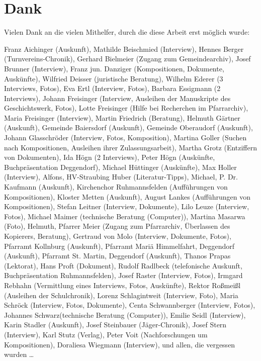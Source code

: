 \section{Dank}

Vielen Dank an die vielen Mithelfer, durch die diese Arbeit erst möglich
wurde:

Franz Aichinger (Auskunft),
Mathilde Beischmied (Interview),
Hennes Berger (Turnvereins-Chronik),
Gerhard Bielmeier (Zugang zum Gemeindearchiv),
Josef Brunner (Interview),
Franz jun. Danziger (Kompositionen, Dokumente, Auskünfte),
Wilfried Deisser (juristische Beratung),
Wilhelm Ederer (3 Interviews, Fotos),
Eva Ertl (Interview, Fotos),
Barbara Essigmann (2 Interviews),
Johann Freisinger (Interview, Ausleihen der Manuskripte des Geschichtswerk, Fotos),
Lotte Freisinger (Hilfe bei Recherchen im Pfarrarchiv),
Maria Freisinger (Interview),
Martin Friedrich (Beratung),
Helmuth Gärtner (Auskunft),
Gemeinde Baiersdorf (Auskunft),
Gemeinde Oberaudorf (Auskunft),
Johann Glasschröder (Interview, Fotos, Komposition),
Martina Goller (Suchen nach Kompositionen, Ausleihen ihrer Zulassungsarbeit),
Martha Grotz (Entziffern von Dokumenten),
Ida Högn (2 Interviews),
Peter Högn (Auskünfte, Buchpräsentation Deggendorf),
Michael Hüttinger (Auskünfte),
Max Holler (Interview),
Alfons, HV-Straubing Huber (Literatur-Tipps),
Michael, P. Dr. Kaufmann (Auskunft),
Kirchenchor Ruhmannsfelden (Aufführungen von Kompositionen),
Kloster Metten (Auskunft),
August Lankes (Aufführungen von Kompositionen),
Stefan Leitner (Interview, Dokumente),
Lilo Leuze (Interview, Fotos),
Michael Maimer (technische Beratung (Computer)),
Martina Masarwa (Foto),
Helmuth, Pfarrer Meier (Zugang zum Pfarrarchiv, Überlassen des Kopierers, Beratung),
Gertraud von Molo (Interview, Dokumente, Fotos),
Pfarramt Kollnburg (Auskunft),
Pfarramt Mariä Himmelfahrt, Deggendorf (Auskunft),
Pfarramt St. Martin, Deggendorf (Auskunft),
Thanos Prapas (Lektorat),
Hans Proft (Dokument),
Rudolf Radlbeck (telefonische Auskunft, Buchpräsentation Ruhmannsfelden),
Josef Raster (Interview, Fotos),
Irmgard Rebhahn (Vermittlung eines Interviews, Fotos, Auskünfte),
Rektor Roßmeißl (Ausleihen der Schulchronik),
Lorenz Schlagintweit (Interview, Foto),
Maria Schröck (Interview, Fotos, Dokumente),
Centa Schwannberger (Interview, Fotos),
Johannes Schwarz(technische Beratung (Computer)),
Emilie Seidl (Interview),
Karin Stadler (Auskunft),
Josef Steinbauer (Jäger-Chronik),
Josef Stern (Interview),
Karl Stutz (Verlag),
Peter Voit (Nachforschungen um Kompositionen),
Doraliesa Wiegmann (Interview),
und allen, die vergessen wurden …
